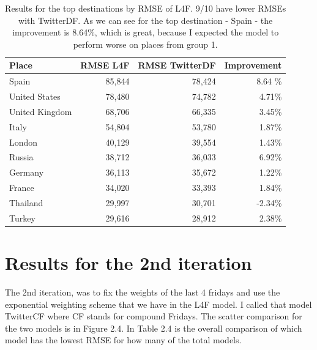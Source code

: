 \documentclass[minf,frontabs,twoside,singlespacing,parskip]{infthesis}
\begin{document}
\begin{table}[]
\begin{center}
\begin{tabular}{ l | r | r | r}
Place & RMSE L4F & RMSE TwitterDF & Improvement \\
\hline
Spain & 85,844 & 78,424 & 8.64 \% \\
United States & 78,480 & 74,782 & 4.71\% \\
United Kingdom & 68,706 & 66,335 & 3.45\% \\
Italy & 54,804 & 53,780 & 1.87\% \\
London & 40,129 & 39,554 & 1.43\% \\
Russia & 38,712 & 36,033 & 6.92\% \\
Germany & 36,113 & 35,672 & 1.22\% \\
France & 34,020 & 33,393 & 1.84\% \\
Thailand & 29,997 & 30,701 & -2.34\% \\
Turkey & 29,616 & 28,912 & 2.38\% 
\end{tabular}
\end{center}
\caption{Results for the top destinations by RMSE of L4F. 9/10 have lower RMSEs with TwitterDF. As we can see for the top destination - Spain - the improvement is 8.64\%, which is great, because I expected the model to perform worse on places from group 1.}
\end{table}


\newpage
\section{Results for the 2nd iteration}

The 2nd iteration, was to fix the weights of the last 4 fridays and use the exponential weighting scheme that we have in the L4F model. I called that model TwitterCF where CF stands for compound Fridays. The scatter comparison for the two models is in Figure 2.4. In Table 2.4 is the overall comparison of which model has the lowest RMSE for how many of the total models. 
\end{document}
